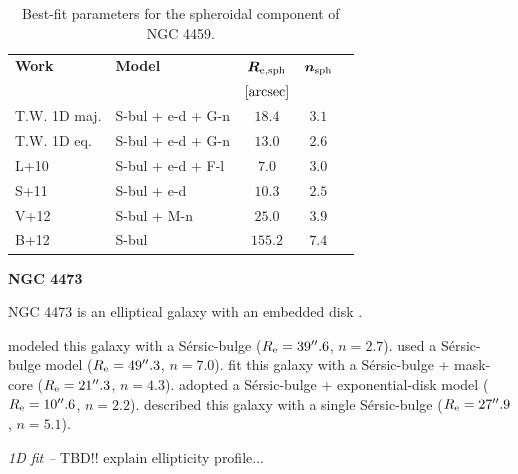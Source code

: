 \documentclass[preprint2]{emulateapj}
\begin{document}
  \begin{table}[h]
  \small
  \caption{Best-fit parameters for the spheroidal component of NGC 4459.}
  \begin{center}
  \begin{tabular}{llccc}
  \hline
  {\bf Work} & {\bf Model}   & $\bm R_{\rm e,sph}$    & $\bm n_{\rm sph}$ \\
    &  &  $[\rm arcsec]$ & \\
  \hline
  T.W. 1D maj. & S-bul + e-d + G-n & $18.4$  &  $3.1$ \\
  T.W. 1D eq.  & S-bul + e-d + G-n & $13.0$  &  $2.6$ \\
  \hline
  L+10      & S-bul + e-d + F-l & $7.0$   &  $3.0$ \\
  S+11      & S-bul + e-d	& $10.3$  &  $2.5$ \\
  V+12      & S-bul + M-n	& $25.0$  &  $3.9$ \\
  B+12      & S-bul		& $155.2$ &  $7.4$ \\
  \hline
  \end{tabular}
  \end{center}
  \label{tab:n4459}
  \end{table}




  \clearpage\newpage\noindent
  {\bf NGC 4473 \\}

  NGC 4473 is an elliptical galaxy with an embedded disk \citep{scorzabender1998,ledo2010}.

  \cite{grahamdriver2007} modeled this galaxy with a S\'ersic-bulge 
  ($R_{\rm e} = 39''.6$, $n = 2.7$). 
  \cite{sani2011} used a S\'ersic-bulge model
  ($R_{\rm e} = 49''.3$, $n = 7.0$). 
  \cite{vika2012} fit this galaxy with a S\'ersic-bulge + mask-core 
  ($R_{\rm e} = 21''.3$, $n = 4.3$). 
  \cite{beifiori2012} adopted a S\'ersic-bulge + exponential-disk model 
  ($R_{\rm e} = 10''.6$, $n = 2.2$).  
  \cite{lasker2014data} described this galaxy with a single S\'ersic-bulge 
  ($R_{\rm e} = 27''.9$, $n = 5.1$).  


  \emph{1D fit -- }
  TBD!! explain ellipticity profile...
\end{document}
